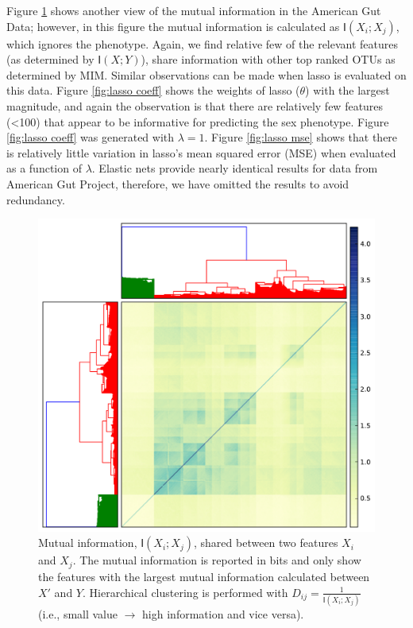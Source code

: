 \documentclass{acm_proc_article-sp}
\begin{document}
Figure \ref{fig:mi} shows another view of the mutual information in the American Gut Data; however, in this figure the mutual information is calculated as $\textsf{I}(X_i;X_j)$, which ignores the phenotype. Again, we find relative few of the relevant features (as determined by $\textsf{I}(X;Y)$), share information with other top ranked OTUs as determined by MIM. Similar observations can be made when lasso is evaluated on this data. Figure \ref{fig:lasso coeff} shows the weights of lasso ($\theta$) with the largest magnitude, and again the observation is that there are relatively few features (<100) that appear to be informative for predicting the sex phenotype. Figure \ref{fig:lasso coeff} was generated with $\lambda=1$. Figure \ref{fig:lasso mse} shows that there is relatively little variation in lasso's mean squared error (MSE) when evaluated as a function of $\lambda$. Elastic nets provide nearly identical results for data from American Gut Project, therefore, we have omitted the results to avoid  redundancy. 

\begin{figure}
  \centering
  \includegraphics[width=.6\textwidth]{ag-t1000-mutual-information.pdf}
  \caption{Mutual information, $\textsf{I}(X_i;X_j)$, shared between two features $X_i$ and $X_j$. The mutual information is reported in bits and only show the features with the largest mutual information calculated between $X'$ and $Y$. Hierarchical clustering is performed with $D_{ij} = \frac{1}{\textsf{I}(X_i;X_j)}$ (i.e., small value $\rightarrow$ high information and vice versa).}
  \label{fig:mi}
\end{figure}
\end{document}
